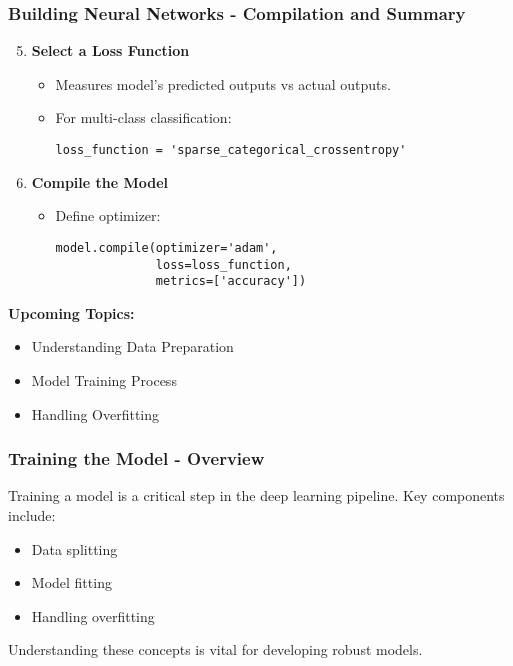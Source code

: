 \documentclass[aspectratio=169]{beamer}
\begin{document}
\begin{frame}[fragile]
    \frametitle{Building Neural Networks - Compilation and Summary}
    \begin{enumerate}
        \setcounter{enumi}{4}
        \item \textbf{Select a Loss Function}
        \begin{itemize}
            \item Measures model's predicted outputs vs actual outputs.
            \item For multi-class classification:
            \begin{lstlisting}
loss_function = 'sparse_categorical_crossentropy'
            \end{lstlisting}
        \end{itemize}

        \item \textbf{Compile the Model}
        \begin{itemize}
            \item Define optimizer:
            \begin{lstlisting}
model.compile(optimizer='adam', 
              loss=loss_function, 
              metrics=['accuracy'])
            \end{lstlisting}
        \end{itemize}
    \end{enumerate}
    
    \textbf{Upcoming Topics:}
    \begin{itemize}
        \item Understanding Data Preparation
        \item Model Training Process
        \item Handling Overfitting
    \end{itemize}
\end{frame}

\begin{frame}[fragile]
    \frametitle{Training the Model - Overview}
    Training a model is a critical step in the deep learning pipeline. 
    Key components include:
    \begin{itemize}
        \item Data splitting
        \item Model fitting
        \item Handling overfitting
    \end{itemize}
    Understanding these concepts is vital for developing robust models.
\end{frame}
\end{document}
